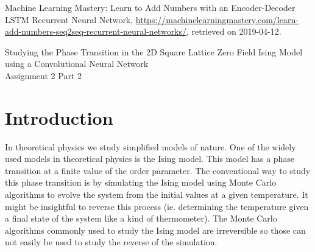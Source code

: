 \documentclass[10 pt, a4paper]{article}
\begin{document}
\vfill

\begin{thebibliography}{99}

Machine Learning Mastery: Learn to Add Numbers with an Encoder-Decoder LSTM Recurrent Neural Network, \url{https://machinelearningmastery.com/learn-add-numbers-seq2seq-recurrent-neural-networks/}, retrieved on 2019-04-12.

\end{thebibliography}

\newpage

\begin{center}
\huge Studying the Phase Transition in the 2D Square Lattice Zero Field Ising Model using a Convolutional Neural Network \\
\Large Assignment 2 Part 2
\end{center}

\setcounter{figure}{0}



\section{Introduction}

In theoretical physics we study simplified models of nature. One of the widely used models in theoretical physics is the Ising model. This model has a phase transition at a finite value of the order parameter. The conventional way to study this phase transition is by simulating the Ising model using Monte Carlo algorithms to evolve the system from the initial values at a given temperature. It might be insightful to reverse this process (ie. determining the temperature given a final state of the system like a kind of thermometer). The Monte Carlo algorithms commonly used to study the Ising model are irreversible so those can not easily be used to study the reverse of the simulation.
\end{document}
